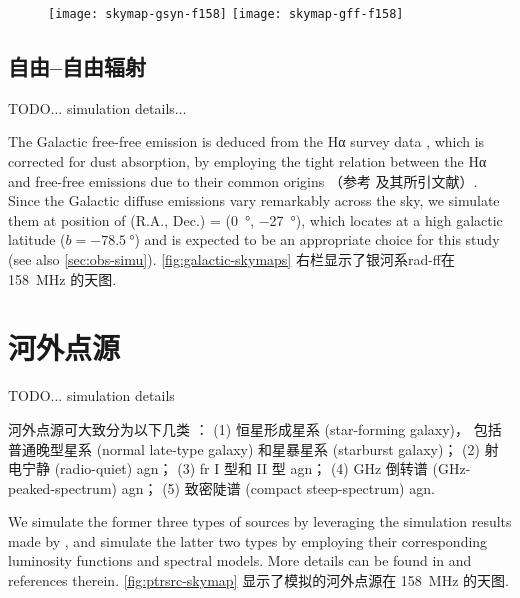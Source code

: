 \begin{figure}[htp]
  \centering
  \texttt{[image: skymap-gsyn-f158]}%
  \hfill
  \texttt{[image: skymap-gff-f158]}
  \label{fig:galactic-skymaps}
\end{figure}

\subsection{自由--自由辐射}
\label{sec:simu-gff}

TODO... simulation details...

The Galactic free-free emission is deduced from the Hα survey
data \cite{finkbeiner2003}, which is corrected for dust absorption,
by employing the tight relation between the Hα and free-free
emissions due to their common origins
（参考  及其所引文献）.
Since the Galactic diffuse emissions vary remarkably across the sky,
we simulate them at position of
(R.A., Dec.\@) = (\SI{0}{\degree}, \SI{-27}{\degree}), which locates at a
high galactic latitude ($b = \SI{-78.5}{\degree}$) and is expected to be
an appropriate choice for this study (see also \autoref{sec:obs-simu}).
\autoref{fig:galactic-skymaps} 右栏显示了银河系\ac{rad-ff}在 \SI{158}{\MHz} 的天图.


\section{河外点源}

TODO... simulation details

河外点源可大致分为以下几类 \cite{snellen2000,wilman2008,wang2010}：
(1) 恒星形成星系 (star-forming galaxy)，
包括普通晚型星系 (normal late-type galaxy) 和星暴星系 (starburst galaxy)；
(2) 射电宁静 (radio-quiet) \ac{agn}；
(3) \ac{fr} I 型和 II 型 \ac{agn}；
(4) GHz 倒转谱 (GHz-peaked-spectrum) \ac{agn}；
(5) 致密陡谱 (compact steep-spectrum) \ac{agn}.

We simulate the former three types of sources by leveraging the simulation
results made by , and simulate the latter two types
by employing their corresponding luminosity functions and spectral models.
More details can be found in  and references therein.
\autoref{fig:ptrsrc-skymap} 显示了模拟的河外点源在 \SI{158}{\MHz} 的天图.


